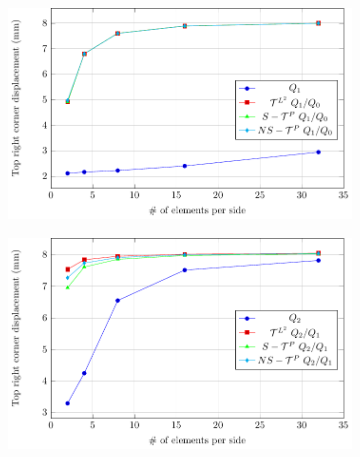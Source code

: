 \documentclass{article}
\begin{document}
\begin{figure}[htb!]
    \centering
	\begin{subfigure}[b]{\textwidth}
        \includegraphics[width=.8\linewidth]{Cook's_membrane_Q1}
    \end{subfigure}
    \centering
	\begin{subfigure}[b]{\textwidth}
        \includegraphics[width=.8\linewidth]{Cook's_membrane_Q2}
    \end{subfigure}
\end{figure}
\end{document}
